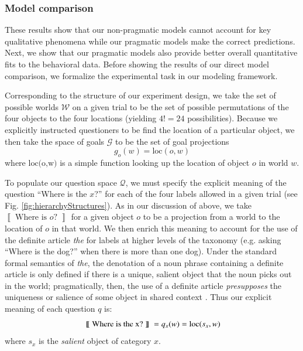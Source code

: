 \documentclass[12pt, floatsintext, jou]{apa6}
\newcommand{\den}[2][]{
\(
\left\llbracket\;\text{#2}\;\right\rrbracket^{#1}
\)
}
\begin{document}
\subsubsection{Model comparison}

These results show that our non-pragmatic models cannot account for key qualitative phenomena while our pragmatic models make the correct predictions. Next, we show that our pragmatic models also provide better overall quantitative fits to the behavioral data. Before showing the results of our direct model comparison, we formalize the experimental task in our modeling framework. 

Corresponding to the structure of our experiment design, we take the set of possible worlds $\mathcal{W}$ on a given trial to be the set of possible permutations of the four objects to the four locations (yielding $4! = 24$ possibilities). Because we explicitly instructed questioners to be find the location of a particular object, we then take the space of goals $\mathcal{G}$ to be the set of goal projections $$g_o(w) = \textrm{loc}(o,w)$$ where $\textrm{loc(o,w)}$ is a simple function looking up the location of object $o$ in world $w$. 

To populate our question space $\mathcal{Q}$, we must specify the explicit meaning of the question ``Where is the $x$?'' for each of the four labels allowed in a given trial (see Fig. \ref{fig:hierarchyStructures}). As in our discussion of  above, we take \textrm{\den{Where is $o$?}} for a given object $o$ to be a projection from a world to the location of $o$ in that world. We then enrich this meaning to account for the use of the definite article \emph{the} for labels at higher levels of the taxonomy (e.g. asking ``Where is the dog?'' when there is more than one dog). Under the standard formal semantics of \emph{the}, the denotation of a noun phrase containing a definite article is only defined if there is a unique, salient object that the noun picks out in the world; pragmatically, then, the use of a definite article \emph{presupposes} the uniqueness or salience of some object in shared context \cite{Lewis79_Scorekeeping, clark1983common, Roberts03_UniquenessDefiniteNounPhrases}. Thus our explicit meaning of each question $q$ is: 
$$\textrm{\den{Where is the x?}} = q_{x}(w) = \textrm{loc}(s_x,w)$$ where $s_x$ is the \emph{salient} object of category $x$. 
\end{document}
